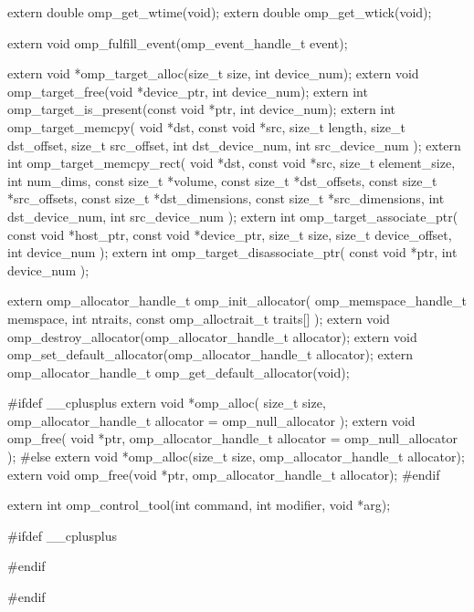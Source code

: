 {\begin{ompcFunction}
{extern double omp_get_wtime(void);
extern double omp_get_wtick(void);

extern void omp_fulfill_event(omp_event_handle_t event);

extern void *omp_target_alloc(size_t size, int device_num);
extern void omp_target_free(void *device_ptr, int device_num);
extern int omp_target_is_present(const void *ptr, int device_num);
extern int omp_target_memcpy(
  void *dst,
  const void *src,
  size_t length,
  size_t dst_offset,
  size_t src_offset,
  int dst_device_num,
  int src_device_num
);
extern int omp_target_memcpy_rect(
  void *dst,
  const void *src,
  size_t element_size,
  int num_dims,
  const size_t *volume,
  const size_t *dst_offsets,
  const size_t *src_offsets,
  const size_t *dst_dimensions,
  const size_t *src_dimensions,
  int dst_device_num,
  int src_device_num
);
extern int omp_target_associate_ptr(
  const void *host_ptr,
  const void *device_ptr,
  size_t size,
  size_t device_offset,
  int device_num
);
extern int omp_target_disassociate_ptr(
  const void *ptr,
  int device_num
);

extern omp_allocator_handle_t omp_init_allocator(
  omp_memspace_handle_t memspace,
  int ntraits,
  const omp_alloctrait_t traits[]
);
extern void omp_destroy_allocator(omp_allocator_handle_t allocator);
extern void omp_set_default_allocator(omp_allocator_handle_t allocator);
extern omp_allocator_handle_t omp_get_default_allocator(void);

#ifdef __cplusplus
extern void *omp_alloc(
  size_t size,
  omp_allocator_handle_t allocator = omp_null_allocator
);
extern void omp_free(
  void *ptr,
  omp_allocator_handle_t allocator = omp_null_allocator
);
#else
extern void *omp_alloc(size_t size, omp_allocator_handle_t allocator);
extern void omp_free(void *ptr, omp_allocator_handle_t allocator);
#endif

extern int omp_control_tool(int command, int modifier, void *arg);

#ifdef __cplusplus
}
#endif

#endif
\end{ompcFunction}} %


